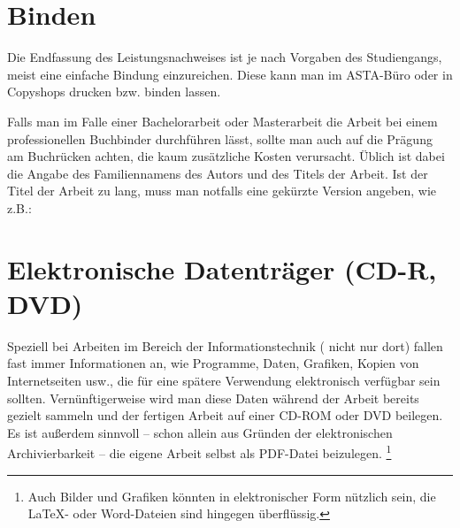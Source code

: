 \section{Binden}

Die Endfassung des Leistungsnachweises ist je nach Vorgaben des Studiengangs, meist eine einfache Bindung einzureichen. Diese kann man im ASTA-Büro oder in Copyshops drucken bzw. binden lassen.

Falls man im Falle einer Bachelorarbeit oder Masterarbeit die Arbeit bei einem
professionellen Buchbinder durchführen lässt, sollte man auch auf
die Prägung am Buchrücken achten, die kaum zusätzliche Kosten
verursacht. Üblich ist dabei die Angabe des Familiennamens des
Autors und des Titels der Arbeit. Ist der Titel der Arbeit zu
lang, muss man notfalls eine gekürzte  Version angeben, wie z.B.:
%
\begin{center}
\setlength{\fboxsep}{3mm}
\end{center}
%



\section{Elektronische Datenträger (CD-R, DVD)}
Speziell bei Arbeiten im Bereich der Informationstechnik (
nicht nur dort) fallen fast immer Informationen an, wie Programme,
Daten, Grafiken, Kopien von Internetseiten usw., die für eine
spätere Verwendung elektronisch verfügbar sein sollten.
Vernünftigerweise wird man diese Daten während der Arbeit bereits
gezielt sammeln und der fertigen Arbeit auf einer CD-ROM oder DVD
beilegen. Es ist außerdem sinnvoll -- schon allein aus Gründen der
elektronischen Archivierbarkeit -- die eigene Arbeit selbst als
PDF-Datei beizulegen.%
\footnote{Auch Bilder und Grafiken könnten in elektronischer Form nützlich
sein, die LaTeX- oder Word-Dateien sind hingegen überflüssig.}



